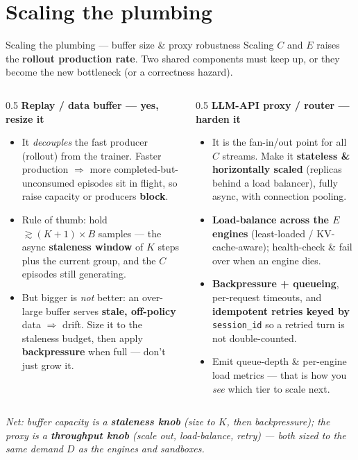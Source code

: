 \documentclass[aspectratio=169]{beamer}
\begin{document}
\section{Scaling the plumbing}

\begin{frame}{Scaling the plumbing --- buffer size \& proxy robustness}
  \footnotesize Scaling $C$ and $E$ raises the \textbf{rollout production rate}. Two shared components must keep up,
  or they become the new bottleneck (or a correctness hazard).
  \begin{columns}[T]
  \begin{column}{0.5\textwidth}
    \textbf{Replay / data buffer --- yes, resize it}
    \begin{itemize}\footnotesize
      \item It \emph{decouples} the fast producer (rollout) from the trainer. Faster production $\Rightarrow$ more
        completed-but-unconsumed episodes sit in flight, so raise capacity or producers \textbf{block}.
      \item Rule of thumb: hold $\gtrsim (K{+}1)\times B$ samples --- the async \textbf{staleness window} of $K$ steps
        plus the current group, and the $C$ episodes still generating.
      \item But bigger is \emph{not} better: an over-large buffer serves \textbf{stale, off-policy} data $\Rightarrow$ drift.
        Size it to the staleness budget, then apply \textbf{backpressure} when full --- don't just grow it.
    \end{itemize}
  \end{column}
  \begin{column}{0.5\textwidth}
    \textbf{LLM-API proxy / router --- harden it}
    \begin{itemize}\footnotesize
      \item It is the fan-in/out point for all $C$ streams. Make it \textbf{stateless \& horizontally scaled}
        (replicas behind a load balancer), fully async, with connection pooling.
      \item \textbf{Load-balance across the $E$ engines} (least-loaded / KV-cache-aware); health-check \& fail over
        when an engine dies.
      \item \textbf{Backpressure + queueing}, per-request timeouts, and \textbf{idempotent retries keyed by}
        \texttt{session\_id} so a retried turn is not double-counted.
      \item Emit queue-depth \& per-engine load metrics --- that is how you \emph{see} which tier to scale next.
    \end{itemize}
  \end{column}
  \end{columns}
  \vspace{0.2em}
  {\footnotesize\itshape Net: buffer capacity is a \textbf{staleness knob} (size to $K$, then backpressure); the proxy is a
  \textbf{throughput knob} (scale out, load-balance, retry) --- both sized to the same demand $D$ as the engines and sandboxes.}
\end{frame}
\end{document}
